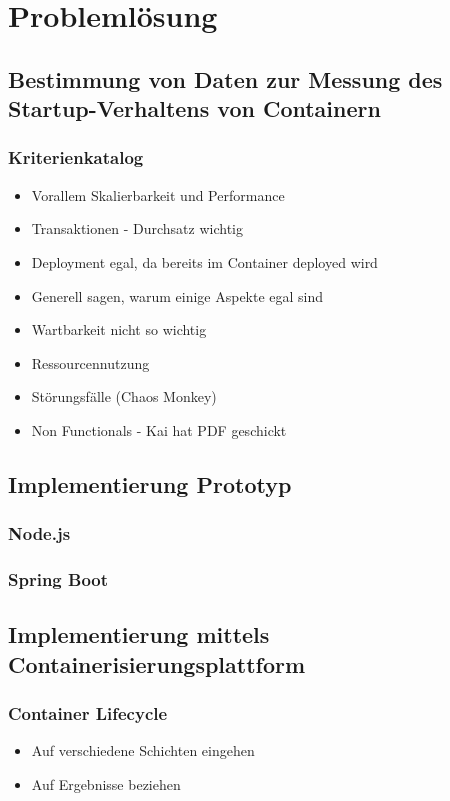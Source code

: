 \chapter{Probleml\"osung}

\section{Bestimmung von Daten zur Messung des Startup-Verhaltens von Containern}
\subsection{Kriterienkatalog}
\begin{itemize}
  \item Vorallem Skalierbarkeit und Performance
  \item Transaktionen - Durchsatz wichtig
  \item Deployment egal, da bereits im Container deployed wird
  \item Generell sagen, warum einige Aspekte egal sind
  \item Wartbarkeit nicht so wichtig
  \item Ressourcennutzung
  \item St\"orungsf\"alle (Chaos Monkey)
  \item Non Functionals - Kai hat PDF geschickt
\end{itemize}

\section{Implementierung Prototyp}
\subsection{Node.js}
\subsection{Spring Boot}

\section{Implementierung mittels Containerisierungsplattform}
\subsection{Container Lifecycle}
\begin{itemize}
  \item Auf verschiedene Schichten eingehen
  \item Auf Ergebnisse beziehen
\end{itemize}
